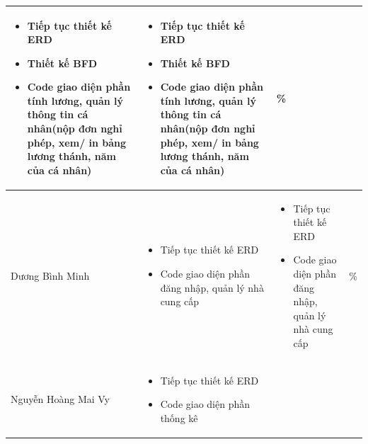 \documentclass[a4paper,12pt]{report}
\begin{document}
\begin{center}
\begin{longtable}{|>{\centering\arraybackslash}p{3cm}|
        >{\centering\arraybackslash}p{5.5cm}|
        >{\centering\arraybackslash}p{5.5cm}|
        >{\centering\arraybackslash}p{1.5cm}|}
\begin{itemize}
            \item Tiếp tục thiết kế ERD
            \item Thiết kế BFD
            \item Code giao diện phần tính lương, quản lý thông tin cá nhân(nộp đơn nghỉ phép, xem/ in bảng lương thánh, năm của cá nhân)
        \end{itemize} &
        \begin{itemize}
            \item Tiếp tục thiết kế ERD
            \item Thiết kế BFD
            \item Code giao diện phần tính lương, quản lý thông tin cá nhân(nộp đơn nghỉ phép, xem/ in bảng lương thánh, năm của cá nhân)
        \end{itemize}
                                                                                                                                      & 100\% \\
        \hline
        Dương Bình Minh                                                                                                               &
        \begin{itemize}
            \item Tiếp tục thiết kế ERD
            \item Code giao diện phần đăng nhập, quản lý nhà cung cấp
        \end{itemize}
                                                                                                                                      &
        \begin{itemize}
            \item Tiếp tục thiết kế ERD
            \item Code giao diện phần đăng nhập, quản lý nhà cung cấp
        \end{itemize}
                                                                                                                                      & 100\% \\
        \hline
        Nguyễn Hoàng Mai Vy                                                                                                           &
        \begin{itemize}
            \item Tiếp tục thiết kế ERD
            \item Code giao diện phần thống kê
        \end{itemize}
                                                                                                                                      &

\end{longtable}
\end{center}
\end{document}
